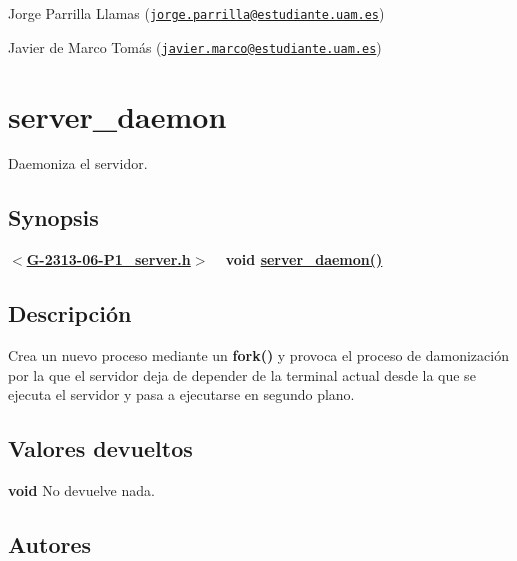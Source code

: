 \begin{DoxyItemize}
\item Jorge Parrilla Llamas (\href{mailto:jorge.parrilla@estudiante.uam.es}{\tt jorge.\+parrilla@estudiante.\+uam.\+es}) 
\item Javier de Marco Tomás (\href{mailto:javier.marco@estudiante.uam.es}{\tt javier.\+marco@estudiante.\+uam.\+es}) 
\end{DoxyItemize}\hypertarget{server_daemon}{}\section{server\+\_\+daemon}\label{server_daemon}
Daemoniza el servidor.\hypertarget{server_daemon_synopsis7}{}\subsection{Synopsis}\label{server_daemon_synopsis7}
{ {\bfseries $<$\hyperlink{G-2313-06-P1__server_8h}{G-\/2313-\/06-\/\+P1\+\_\+server.\+h}$>$} ~\newline
 {\bfseries void \hyperlink{G-2313-06-P1__server_8c_aa0e8000b12d9c52fc1e87847d00c9c47}{server\+\_\+daemon()}} } \hypertarget{server_daemon_descripcion7}{}\subsection{Descripción}\label{server_daemon_descripcion7}
Crea un nuevo proceso mediante un {\bfseries fork()} y provoca el proceso de damonización por la que el servidor deja de depender de la terminal actual desde la que se ejecuta el servidor y pasa a ejecutarse en segundo plano.\hypertarget{server_daemon_return7}{}\subsection{Valores devueltos}\label{server_daemon_return7}

\begin{DoxyItemize}
\item {\bfseries void} No devuelve nada. 
\end{DoxyItemize}\hypertarget{server_daemon_authors7}{}\subsection{Autores}\label{server_daemon_authors7}

